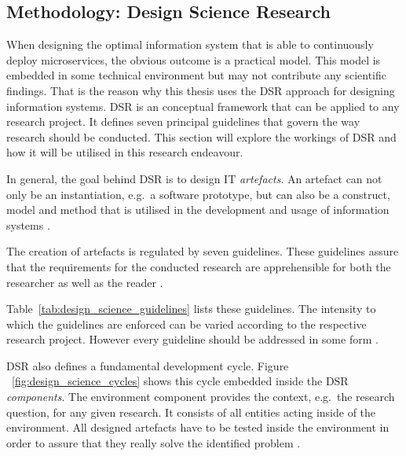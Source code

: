 
\subsection{Methodology: Design Science Research}%
\label{sub:Design_Science_Research}

When designing the optimal information system that is able to continuously
deploy microservices, the obvious outcome is a practical model. This model is
embedded in some technical environment but may not contribute any scientific
findings. That is the reason why this thesis uses the \ac{DSR} approach for
designing information systems. \ac{DSR} is an conceptual framework that can be
applied to any research project. It defines seven principal guidelines that
govern the way research should be conducted. This section will explore the
workings of \ac{DSR} and how it will be utilised in this research endeavour.

In general, the goal behind \ac{DSR} is to design \ac{IT} \textit{artefacts}.
An artefact can not only be an instantiation, e.g.\ a software prototype, but
can also be a construct, model and method that is utilised in the development
and usage of information systems \autocite[p.
82]{VonAlanDesignscienceinformation2004}.

The creation of artefacts is regulated by seven guidelines. These guidelines
assure that the requirements for the conducted research are apprehensible for
both the researcher as well as the reader \autocite[p.
82]{VonAlanDesignscienceinformation2004}.


Table~\ref{tab:design_science_guidelines} lists these guidelines. The intensity
to which the guidelines are enforced can be varied according to the respective
research project. However every guideline should be addressed in some form
\autocite[p.  82]{VonAlanDesignscienceinformation2004}. 

\ac{DSR} also defines a fundamental development cycle. Figure
~\ref{fig:design_science_cycles} shows this cycle embedded inside the \ac{DSR}
\textit{components}. The environment component provides the context, e.g.\ the
research question, for any given research. It consists of all entities acting
inside of the environment. All designed artefacts have to be tested inside the
environment in order to assure that they really solve the identified problem
\autocite[p. 89]{HevnerThreeCycleView2007}.

